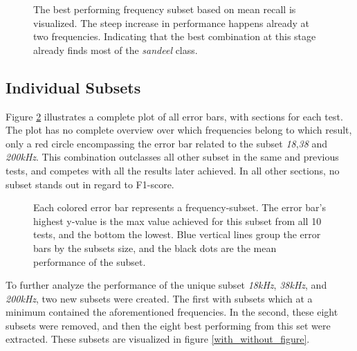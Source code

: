         \clearpage
        \begin{figure}[H]
            \centering
            
            \caption[Best frequency combination - Recall]{The best performing frequency subset based on mean recall is visualized. The steep increase in performance happens already at two frequencies. Indicating that the best combination at this stage already finds most of the \textit{sandeel} class.}
          	\medskip 
            \label{increasing_freq_recall_score_fig}
        \end{figure}

    \subsection{Individual Subsets}
        Figure \ref{errorbar_fig} illustrates a complete plot of all error bars, with sections for each test. The plot has no complete overview over which frequencies belong to which result, only a red circle encompassing the error bar related to the subset \textit{18},\textit{38} and \textit{200kHz}. This combination outclasses all other subset in the same and previous tests, and competes with all the results later achieved. In all other sections, no subset stands out in regard to F1-score.
        \begin{figure}[H]
            \centering
            
            \caption[Error bars per combination]{Each colored error bar represents a frequency-subset. The error bar's highest y-value is the max value achieved for this subset from all 10 tests, and the bottom the lowest. Blue vertical lines group the error bars by the subsets size, and the black dots are the mean performance of the subset.}
          	\medskip 
            \label{errorbar_fig}
        \end{figure}
    
        To further analyze the performance of the unique subset \textit{18kHz}, \textit{38kHz}, and \textit{200kHz}, two new subsets were created. The first with subsets which at a minimum contained the aforementioned frequencies. In the second, these eight subsets were removed, and then the eight best performing from this set were extracted. These subsets are visualized in figure \ref{with_without_figure}.
        
